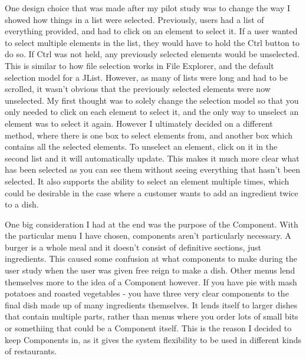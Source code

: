 One design choice that was made after my pilot study was to change the way I showed how things in a list were selected. Previously, users had a list of everything provided, and had to click on an element to select it. If a user wanted to select multiple elements in the list, they would have to hold the Ctrl button to do so. If Ctrl was not held, any previously selected elements would be unselected. This is similar to how file selection works in File Explorer, and the default selection model for a JList. However, as many of lists were long and had to be scrolled, it wasn't obvious that the previously selected elements were now unselected. My first thought was to  solely change the selection model so that you only needed to click on each element to select it, and the only way to unselect an element was to select it again. However I ultimately decided on a different method, where there is one box to select elements from, and another box which contains all the selected elements. To unselect an element, click on it in the second list and it will automatically update. This makes it much more clear what has been selected as you can see them without seeing everything that hasn't been selected. It also supports the ability to select an element multiple times, which could be desirable in the case where a customer wants to add an ingredient twice to a dish.

One big consideration I had at the end was the purpose of the Component. With the particular menu I have chosen, components aren't particularly necessary. A burger is a whole meal and it doesn't consist of definitive sections, just ingredients. This caused some confusion at what components to make during the user study when the user was given free reign to make a dish.  Other menus lend themselves more to the idea of a Component however. If you have pie with mash potatoes and roasted vegetables - you have three very clear components to the final dish made up of many ingredients themselves. It lends itself to larger dishes that contain multiple parts, rather than menus where you order lots of small bits or somethiing that could be a Component itself. This is the reason I decided to keep Components in, as it gives the system flexibility to be used in different kinds of restaurants.

